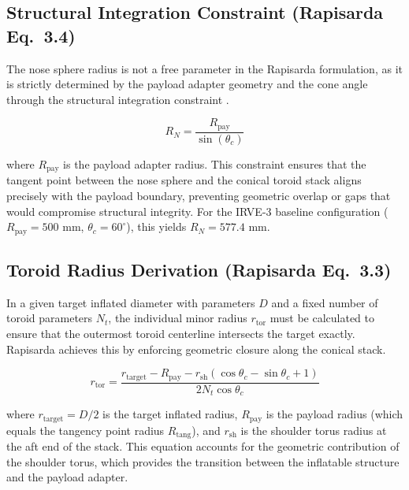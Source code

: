 \subsection{Structural Integration Constraint (Rapisarda Eq.\ 3.4)}

The nose sphere radius is not a free parameter in the Rapisarda formulation, as it is strictly determined by the payload adapter geometry and the cone angle through the structural integration constraint \cite{rapisarda2023mdao}.

\begin{equation}
    R_N = \frac{R_{\text{pay}}}{\sin(\theta_c)}
    \label{eq:structural_integration}
\end{equation}

\noindent where $R_{\text{pay}}$ is the payload adapter radius. This constraint ensures that the tangent point between the nose sphere and the conical toroid stack aligns precisely with the payload boundary, preventing geometric overlap or gaps that would compromise structural integrity. For the IRVE-3 baseline configuration ($R_{\text{pay}} = 500$ mm, $\theta_c = 60^\circ$), this yields $R_N = 577.4$ mm.

\subsection{Toroid Radius Derivation (Rapisarda Eq.\ 3.3)}

In a given target inflated diameter with parameters $D$ and a fixed number of toroid parameters $N_t$, the individual minor radius $r_{\text{tor}}$ must be calculated to ensure that the outermost toroid centerline intersects the target exactly. Rapisarda \cite{rapisarda2023mdao} achieves this by enforcing geometric closure along the conical stack.

\begin{equation}
    r_{\text{tor}} = \frac{r_{\text{target}} - R_{\text{pay}} - r_{\text{sh}} \left( \cos\theta_c - \sin\theta_c + 1 \right)}{2 N_t \cos\theta_c}
    \label{eq:toroid_radius}
\end{equation}

\noindent where $r_{\text{target}} = D/2$ is the target inflated radius, $R_{\text{pay}}$ is the payload radius (which equals the tangency point radius $R_{\text{tang}}$), and $r_{\text{sh}}$ is the shoulder torus radius at the aft end of the stack. This equation accounts for the geometric contribution of the shoulder torus, which provides the transition between the inflatable structure and the payload adapter.

